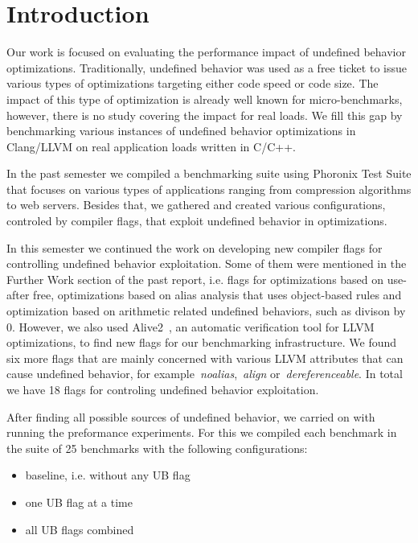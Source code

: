 \section{Introduction}

Our work is focused on evaluating the performance impact of undefined behavior
optimizations. Traditionally, undefined behavior was used as a free ticket to
issue various types of optimizations targeting either code speed or code size.
The impact of this type of optimization is already well known for
micro-benchmarks, however, there is no study covering the impact for real loads.
We fill this gap by benchmarking various instances of undefined behavior
optimizations in Clang/LLVM on real application loads written in C/C++.

In the past semester we compiled a benchmarking suite using Phoronix Test Suite
that focuses on various types of applications ranging from compression
algorithms to web servers. Besides that, we gathered and created various
configurations, controled by compiler flags, that exploit undefined behavior in
optimizations.

In this semester we continued the work on developing new compiler flags for
controlling undefined behavior exploitation. Some of them were mentioned in the
Further Work section of the past report, i.e. flags for optimizations based on
use-after free, optimizations based on alias analysis that uses object-based
rules and optimization based on arithmetic related undefined behaviors, such as
divison by 0. However, we also used Alive2~\cite{lopes2021alive2}, an automatic
verification tool for LLVM optimizations, to find new flags for our benchmarking
infrastructure. We found six more flags that are mainly concerned with various
LLVM attributes that can cause undefined behavior, for
example~\textit{noalias},~\textit{align} or~\textit{dereferenceable}. In total
we have 18 flags for controling undefined behavior exploitation.

After finding all possible sources of undefined behavior, we carried on with
running the preformance experiments. For this we compiled each benchmark in the
suite of 25 benchmarks with the following configurations:
\begin{itemize}
  \item baseline, i.e. without any UB flag
  \item one UB flag at a time
  \item all UB flags combined
\end{itemize}

